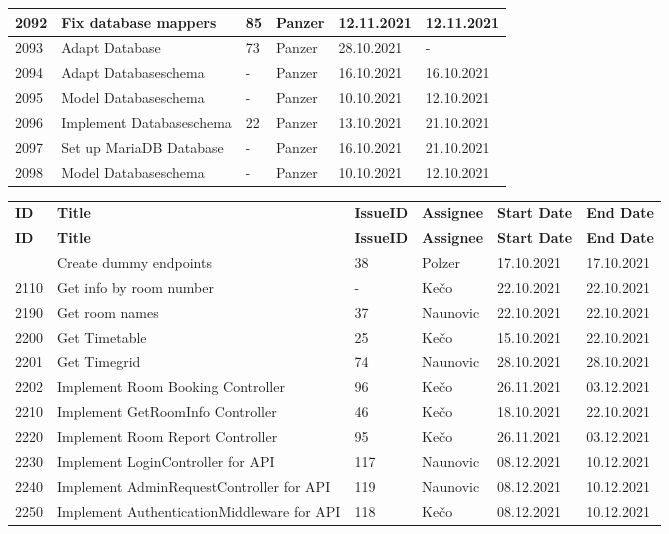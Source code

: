 \begin{longtable}{|p{}|p{}|p{}|p{}|p{}|p{}|}
    2092 & Fix database mappers & 85 & Panzer & 12.11.2021 & 12.11.2021 \\ \hline
    2093 & Adapt Database & 73 & Panzer & 28.10.2021 & - \\ \hline
    2094 & Adapt Databaseschema & - & Panzer & 16.10.2021 & 16.10.2021 \\ \hline
    2095 & Model Databaseschema & - & Panzer & 10.10.2021 & 12.10.2021 \\ \hline
    2096 & Implement Databaseschema & 22 & Panzer & 13.10.2021 & 21.10.2021 \\ \hline
    2097 & Set up MariaDB Database & - & Panzer & 16.10.2021 & 21.10.2021 \\ \hline
    2098 & Model Databaseschema & - & Panzer & 10.10.2021 & 12.10.2021 \\ \hline
\end{longtable}


\begin{longtable}{|p{}|p{}|p{}|p{}|p{}|p{}|} \hline
    \textbf{ID} & \textbf{Title} & \textbf{Issue\-ID} & \textbf{Assignee} & \textbf{Start Date} & \textbf{End\- Date} \\ \hhline{|=|=|=|=|=|=|}
    \endfirsthead
    \hline
    \textbf{ID} & \textbf{Title} & \textbf{Issue\-ID} & \textbf{Assignee} & \textbf{Start Date} & \textbf{End\- Date} \\ \hhline{|=|=|=|=|=|=|}
    \endhead
    2100 & Create dummy endpoints & 38 & Polzer & 17.10.2021 & 17.10.2021 \\ \hline
    2110 & Get info by room number & - & Kečo & 22.10.2021 & 22.10.2021 \\ \hline
    2190 & Get room names & 37 & Naunovic & 22.10.2021 & 22.10.2021 \\ \hline
    2200 & Get Timetable & 25 & Kečo & 15.10.2021 & 22.10.2021 \\ \hline
    2201 & Get Timegrid & 74 & Naunovic & 28.10.2021 & 28.10.2021 \\ \hline
    2202 & Implement Room Booking Controller & 96 & Kečo & 26.11.2021 & 03.12.2021 \\ \hline
    2210 & Implement GetRoomInfo Controller & 46 & Kečo & 18.10.2021 & 22.10.2021 \\ \hline
    2220 & Implement Room Report Controller & 95 & Kečo & 26.11.2021 & 03.12.2021 \\ \hline
    2230 & Implement LoginController for API & 117 & Naunovic & 08.12.2021 & 10.12.2021 \\ \hline
    2240 & Implement AdminRequestController for API & 119 & Naunovic & 08.12.2021 & 10.12.2021 \\ \hline
    2250 & Implement AuthenticationMiddleware for API & 118 & Kečo & 08.12.2021 & 10.12.2021 \\ \hline
\end{longtable}

